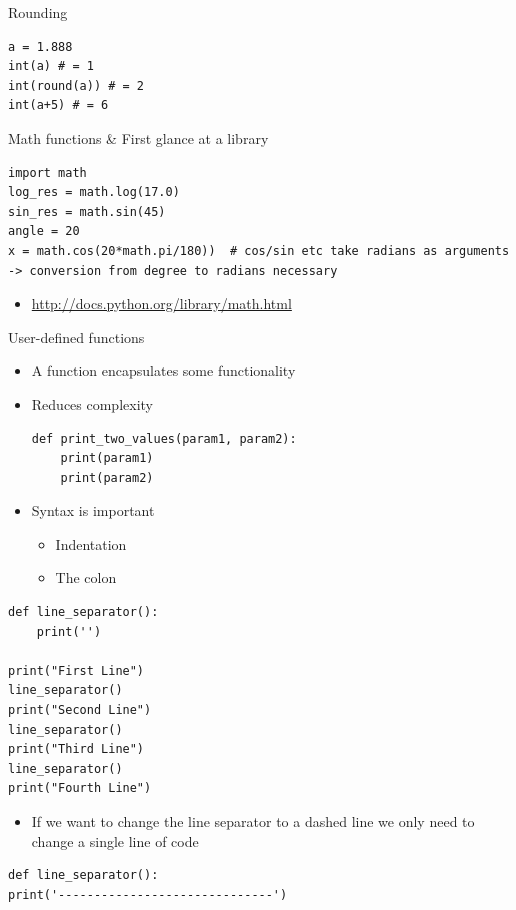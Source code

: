\documentclass[10pt, a4paper]{beamer} %
\begin{document}
\begin{frame}
\framebreak

\begin{block}{Rounding}
    \begin{lstlisting}
a = 1.888
int(a) # = 1
int(round(a)) # = 2
int(a+5) # = 6
    \end{lstlisting}
\end{block}
\begin{block}{Math functions \& First glance at a library}
    \begin{lstlisting}
import math
log_res = math.log(17.0)
sin_res = math.sin(45)
angle = 20
x = math.cos(20*math.pi/180))  # cos/sin etc take radians as arguments -> conversion from degree to radians necessary      
    \end{lstlisting}
    \begin{itemize}
        \item \tiny \url{http://docs.python.org/library/math.html}
    \end{itemize}
\end{block}

\framebreak

\begin{block}{User-defined functions}
    \begin{itemize}
        \item A function encapsulates some functionality
        \item Reduces complexity
        \begin{lstlisting}
def print_two_values(param1, param2):
    print(param1)
    print(param2)            
        \end{lstlisting}
        \item Syntax is important
        \begin{itemize}
            \item Indentation
            \item The colon
        \end{itemize}
    \end{itemize}
\end{block}
\framebreak
\begin{examples}
    \begin{lstlisting}
def line_separator():
    print('')

print("First Line")
line_separator()
print("Second Line")
line_separator()
print("Third Line")
line_separator()
print("Fourth Line")
\end{lstlisting}
\end{examples}
\begin{itemize}
    \item If we want to change the line separator to a dashed line we only need to change a single line of code
\end{itemize}
\begin{lstlisting}
def line_separator():
print('------------------------------')
\end{lstlisting}



\end{frame}
\end{document}
